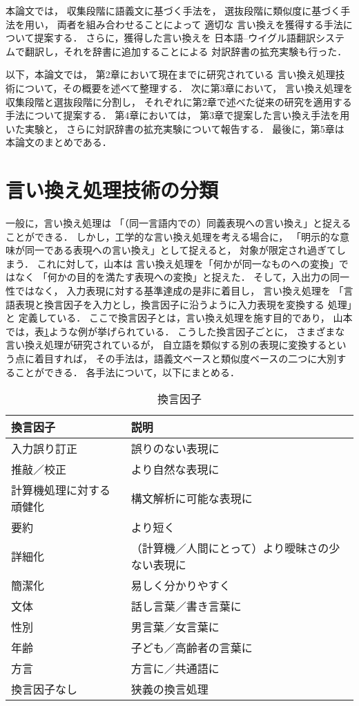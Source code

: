 本論文では，
収集段階に語義文に基づく手法を，
選抜段階に類似度に基づく手法を用い，
両者を組み合わせることによって
適切な
言い換えを獲得する手法について提案する．
さらに，獲得した言い換えを
日本語--ウイグル語翻訳システムで翻訳し，それを辞書に追加することによる
対訳辞書の拡充実験も行った．

以下，本論文では，
第2章において現在までに研究されている
言い換え処理技術について，その概要を述べて整理する．
次に第3章において，
言い換え処理を収集段階と選抜段階に分割し，
それぞれに第2章で述べた従来の研究を適用する手法について提案する．
第4章においては，
第3章で提案した言い換え手法を用いた実験と，
さらに対訳辞書の拡充実験について報告する．
最後に，第5章は本論文のまとめである．

\section{言い換え処理技術の分類}

一般に，言い換え処理は
「（同一言語内での）同義表現への言い換え」と捉えることができる．
しかし，工学的な言い換え処理を考える場合に，
「明示的な意味が同一である表現への言い換え」として捉えると，
対象が限定され過ぎてしまう．
これに対して，山本\cite{yama01}は
言い換え処理を「何かが同一なものへの変換」ではなく
「何かの目的を満たす表現への変換」と捉えた．
そして，入出力の同一性ではなく，
入力表現に対する基準達成の是非に着目し，
言い換え処理を
「言語表現と換言因子を入力とし，換言因子に沿うように入力表現を変換する
処理」と
定義している．
ここで換言因子とは，言い換え処理を施す目的であり，
山本\cite{yama01}では，表\ref{inshi}ような例が挙げられている．
こうした換言因子ごとに，
さまざまな言い換え処理が研究されているが，
自立語を類似する別の表現に変換するという点に着目すれば，
その手法は，語義文ベースと類似度ベースの二つに大別することができる．
各手法について，以下にまとめる．

\begin{table}[tb]
  \caption{\label{inshi}換言因子}
 \begin{center}
  \begin{tabular}{l|l}\hline
   換言因子 & 説明 \\ \hline
   入力誤り訂正 & 誤りのない表現に \\ 
   推敲／校正 & より自然な表現に \\ 
   計算機処理に対する頑健化 & 構文解析に可能な表現に \\ 
   要約 & より短く \\ 
   詳細化 & （計算機／人間にとって）より曖昧さの少ない表現に \\ 
   簡潔化 & 易しく分かりやすく \\ 
   文体 & 話し言葉／書き言葉に \\ 
   性別 & 男言葉／女言葉に \\ 
   年齢 & 子ども／高齢者の言葉に \\
   方言 & 方言に／共通語に \\ 
   換言因子なし & 狭義の換言処理 \\
 \hline
  \end{tabular}
 \end{center}
\end{table}


